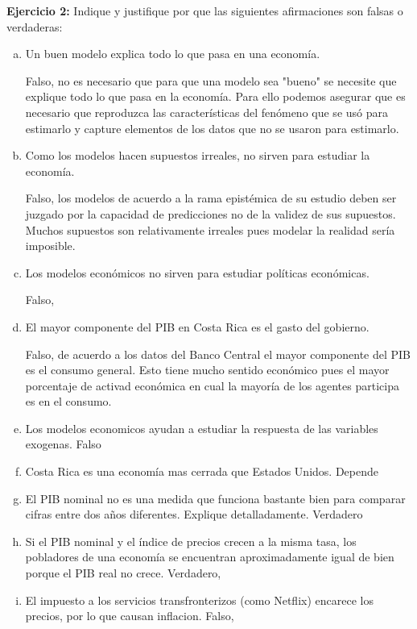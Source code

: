 \textbf{Ejercicio 2:} Indique y justifique por que las siguientes afirmaciones son falsas o verdaderas:
\begin{enumerate}[(a)]
    \item Un buen modelo explica todo lo que pasa en una economía.
    
    Falso, no es necesario que para que una modelo sea "bueno" se necesite que explique todo lo que pasa en la economía. Para ello podemos asegurar que es necesario que reproduzca las características del fenómeno que se usó para estimarlo y capture elementos de los datos que no se usaron para estimarlo.
    \item Como los modelos hacen supuestos irreales, no sirven para estudiar la economía.
    
    Falso, los modelos de acuerdo a la rama epistémica de su estudio deben ser juzgado por la capacidad de predicciones no de la validez de sus supuestos. Muchos supuestos son relativamente irreales pues modelar la realidad sería imposible.
    
    \item Los modelos económicos no sirven para estudiar políticas económicas.
    
    Falso, 
    \item El mayor componente del PIB en Costa Rica es el gasto del gobierno.
    
    Falso, de acuerdo a los datos del Banco Central el mayor componente del PIB es el consumo general. Esto tiene mucho sentido económico pues el mayor porcentaje de activad económica en cual la mayoría de los agentes participa es en el consumo.
    
    \item Los modelos economicos ayudan a estudiar la respuesta de las variables exogenas.
    Falso
    
    \item  Costa Rica es una economía mas cerrada que Estados Unidos.
    Depende
    
    \item El PIB nominal no es una medida que funciona bastante bien para comparar cifras entre dos años diferentes. Explique detalladamente.
    Verdadero
    
    \item Si el PIB nominal y el índice de precios crecen a la misma tasa, los pobladores de una economía se encuentran aproximadamente igual de bien porque el PIB real no crece.
    Verdadero, 
    
    \item  El impuesto a los servicios transfronterizos (como Netflix) encarece los precios, por lo que causan inflacion.
    Falso,
    

\end{enumerate}
